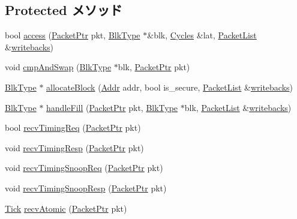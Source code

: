 \subsection*{Protected メソッド}
\begin{DoxyCompactItemize}
\item 
bool \hyperlink{classCache_ae24e0e790eea2373d750eb6642007750}{access} (\hyperlink{classPacket}{PacketPtr} pkt, \hyperlink{classCache_a10db52a1c10bfd238e0e3d37c4560495}{BlkType} $\ast$\&blk, \hyperlink{classCycles}{Cycles} \&lat, \hyperlink{classstd_1_1list}{PacketList} \&\hyperlink{group__CacheStatistics_gace2b37e760e47862f243e4b03c05ef5e}{writebacks})
\item 
void \hyperlink{classCache_a911af8215907296fb2453c696cb89a02}{cmpAndSwap} (\hyperlink{classCache_a10db52a1c10bfd238e0e3d37c4560495}{BlkType} $\ast$blk, \hyperlink{classPacket}{PacketPtr} pkt)
\item 
\hyperlink{classCache_a10db52a1c10bfd238e0e3d37c4560495}{BlkType} $\ast$ \hyperlink{classCache_a3da8f395921d5519e28d1c60961ae6c5}{allocateBlock} (\hyperlink{base_2types_8hh_af1bb03d6a4ee096394a6749f0a169232}{Addr} addr, bool is\_\-secure, \hyperlink{classstd_1_1list}{PacketList} \&\hyperlink{group__CacheStatistics_gace2b37e760e47862f243e4b03c05ef5e}{writebacks})
\item 
\hyperlink{classCache_a10db52a1c10bfd238e0e3d37c4560495}{BlkType} $\ast$ \hyperlink{classCache_a4943b9a8a4801f454a968416b456dc21}{handleFill} (\hyperlink{classPacket}{PacketPtr} pkt, \hyperlink{classCache_a10db52a1c10bfd238e0e3d37c4560495}{BlkType} $\ast$blk, \hyperlink{classstd_1_1list}{PacketList} \&\hyperlink{group__CacheStatistics_gace2b37e760e47862f243e4b03c05ef5e}{writebacks})
\item 
bool \hyperlink{classCache_a3344d9dd0f83257feab5424e761f31c6}{recvTimingReq} (\hyperlink{classPacket}{PacketPtr} pkt)
\item 
void \hyperlink{classCache_a083c4da6cf866d660a126f4174bba7fc}{recvTimingResp} (\hyperlink{classPacket}{PacketPtr} pkt)
\item 
void \hyperlink{classCache_aff3031c56fc4947a19695c868bb8233e}{recvTimingSnoopReq} (\hyperlink{classPacket}{PacketPtr} pkt)
\item 
void \hyperlink{classCache_a55143a3333ff75d0df66bd6e4eb50fb7}{recvTimingSnoopResp} (\hyperlink{classPacket}{PacketPtr} pkt)
\item 
\hyperlink{base_2types_8hh_a5c8ed81b7d238c9083e1037ba6d61643}{Tick} \hyperlink{classCache_a5f0b4c4a94f6b0053f9d7a4eb9c2518a}{recvAtomic} (\hyperlink{classPacket}{PacketPtr} pkt)

\end{DoxyCompactItemize}
